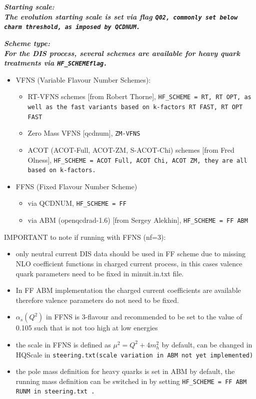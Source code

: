 \begin{description}
\begin{description}
\item \it\bf Starting scale: \rm\\
The evolution starting scale is set via flag  \tt{Q02}\rm, commonly set below charm threshold, as imposed by QCDNUM.

\item \it\bf Scheme type: \rm\\
For the DIS process, several schemes are available for heavy quark treatments via  \tt{HF\_SCHEME}\rm flag.
\begin{itemize}
  \item VFNS (Variable Flavour Number Schemes):
    \begin{itemize}
     \item RT-VFNS  schemes                               [from Robert Thorne], \tt{HF\_SCHEME = RT, RT OPT}\rm, as well as the fast variants based on k-factors \tt{RT FAST, RT OPT FAST}
     \item Zero Mass VFNS                                 [qcdnum], \tt{ZM-VFNS}\rm   
     \item  ACOT (ACOT-Full, ACOT-ZM, S-ACOT-Chi) schemes  [from Fred Olness], \tt{HF\_SCHEME = ACOT Full, ACOT Chi, ACOT ZM}\rm, they are all based on k-factors. 
    \end{itemize}
  \item FFNS (Fixed Flavour Number Scheme)
    \begin{itemize}
    \item via QCDNUM, \tt{HF\_SCHEME = FF}\rm 
    \item via ABM (openqcdrad-1.6)   [from Sergey Alekhin], \tt{HF\_SCHEME = FF ABM}\rm
    \end{itemize}
\end{itemize}
IMPORTANT to note if running with FFNS (nf=3): 
\begin{itemize}
  \item only neutral current DIS data should be used in FF scheme due to missing NLO 
    coefficient functions in charged current process, in this cases valence quark parameters  
    need to be fixed in minuit.in.txt file.
  \item In FF ABM implementation the charged current coefficients are available
    therefore valence parameters do not need to be fixed.
  \item $\alpha_s(Q^2)$ in FFNS is 3-flavour and recommended to be set to the value of 0.105 
    such that is not too high at low energies
  \item the scale in FFNS is defined as $\mu^2 = Q^2 + 4m_h^2$ by default, can be 
    changed in HQScale in \tt{steering.txt}\rm (scale variation in ABM not yet implemented)
  \item  the pole mass definition for heavy quarks is set in ABM by default, 
    the running mass definition \cite{Alekhin:runm} can be switched in 
    by setting \tt{HF\_SCHEME = FF ABM RUNM} \rm in \tt{steering.txt} \rm. 
\end{itemize}


\end{description}
\end{description}
